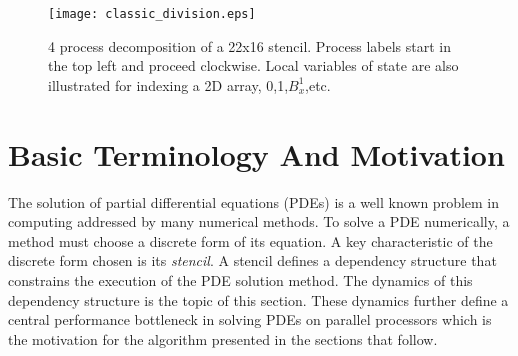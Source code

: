 
\newcommand{\nxl}{\textup{\textsf{nxl}}} %
\newcommand{\nyl}{\textup{\textsf{nyl}}} %
\newcommand{\tm}{ \text{$t_{max}$} }
\newcommand{\av}{ \mathbf{a} }
\newcommand{\uv}{ \mathbf{u} }
\newcommand{\bv}{ \mathbf{b} }
\newcommand{\pv}{ \mathbf{p} }
\newcommand{\orig} {\mathcal{O}}

\newcommand{\rnt}{ R_{-\theta} }
\newcommand{\rt}{ R_{\theta} }

\newcommand{\la}{\leftarrow} %
\newcommand{\ra}{\rightarrow} %

\newcommand{\dx}{\textsf{dx}}
\newcommand{\dy}{\textsf{dy}}

\newcommand{\data}{\textup{\textsf{data}}}
\newcommand{\psendf}{\textit{postSend}}
\newcommand{\precvf}{\textit{postRecv}}
\newcommand{\psend}[2]{\psendf(#1,#2)}
\newcommand{\precv}[2]{\precvf(#1,#2)}
\newcommand{\pid}{\textup{\textsf{pid}}} %


\begin{figure}[t]
  \centering
  \texttt{[image: classic\_division.eps]}
  \caption{4 process decomposition of a 22x16 stencil.  Process labels start in the top left and proceed clockwise.  Local
  variables of state are also illustrated for indexing a 2D array, 0,1,$B_x^1$,etc.}
  \label{fig:basic}
\end{figure}

\section{Basic Terminology And Motivation}\label{sec:problem_statement}
The solution of partial differential equations (PDEs)
is a well known problem in computing addressed by many
numerical methods.
To solve a PDE numerically, a method must choose a discrete
form of its equation.
A key characteristic of the discrete form chosen is its
 {\it stencil}.
A stencil
 defines a dependency structure that constrains
the execution of the PDE solution method.  The dynamics
of this dependency structure is the topic of this section.
These dynamics further define a central performance bottleneck in
solving PDEs on parallel processors which is the motivation
for the algorithm
presented in the sections that follow.

